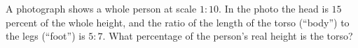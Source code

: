 A photograph shows a whole person at scale $1:10$. In the photo the head is $15$ percent of the whole height, and the ratio of the length of the torso (``body'') to the legs (``foot'') is $5:7$. What percentage of the person's real height is the torso?
